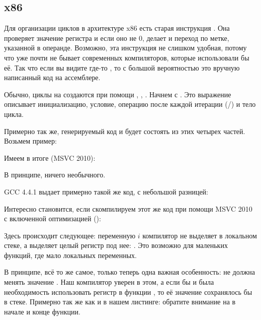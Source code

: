 \subsection{x86}

Для организации циклов в архитектуре x86 есть старая инструкция \LOOP. 
Она проверяет значение регистра \ECX и если оно не 0, делает  \ECX 
и переход по метке, указанной в операнде. 
Возможно, эта инструкция не слишком удобная, потому что уже почти не бывает современных компиляторов, 
которые использовали бы её. Так что если вы видите где-то \LOOP, то с большой вероятностью это 
вручную написанный код на ассемблере.

Обычно, циклы на \CCpp создаются при помощи , , .
Начнем с .
Это выражение описывает инициализацию, условие, операцию после каждой итерации
(/) и тело цикла.



Примерно так же, генерируемый код и будет состоять из этих четырех частей.
Возьмем пример:



Имеем в итоге (MSVC 2010):



В принципе, ничего необычного.

\ifdefined\IncludeGCC
GCC 4.4.1 выдает примерно такой же код, с небольшой разницей:



Интересно становится, если скомпилируем этот же код при помощи MSVC 2010 с включенной оптимизацией
 (\TT{\Ox}):
\fi



Здесь происходит следующее: переменную $i$ компилятор не выделяет в локальном стеке, 
а выделяет целый регистр под нее: \ESI. 
Это возможно для маленьких функций, где мало локальных переменных.

В принципе, всё то же самое, только теперь одна важная особенность: 
\ttf не должна менять значение \ESI. 
Наш компилятор уверен в этом, а если бы и была необходимость использовать регистр \ESI в функции \ttf, 
то её значение сохранялось бы в стеке. Примерно так же как и в нашем листинге: 
обратите внимание на  в начале и конце функции.

